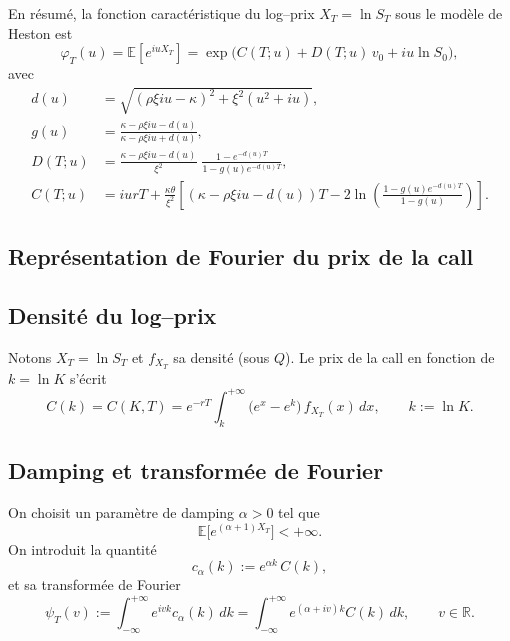 \documentclass[11pt,a4paper]{article}
\newcommand{\1}{\mathbf{1}}
\begin{document}
En r\'esum\'e, la fonction caract\'eristique du log--prix $X_T=\ln S_T$ sous
le mod\`ele de Heston est
\begin{equation}
\boxed{
\varphi_T(u)
= \mathbb{E}\!\left[ e^{i u X_T} \right]
= \exp\!\Big(
C(T;u) + D(T;u)\,v_0 + i u \ln S_0
\Big),
}
\end{equation}
avec
\begin{align}
d(u) &= \sqrt{(\rho\xi i u - \kappa)^2 + \xi^2(u^2+i u)},\\[3pt]
g(u) &= \frac{\kappa - \rho\xi i u - d(u)}{\kappa - \rho\xi i u + d(u)},\\[3pt]
D(T;u) &= \frac{\kappa - \rho\xi i u - d(u)}{\xi^2}\;
         \frac{1 - e^{-d(u)T}}{1 - g(u)e^{-d(u)T}},\\[3pt]
C(T;u) &= i u r T
+ \frac{\kappa\theta}{\xi^2}
  \left[
     \left(\kappa - \rho\xi i u - d(u)\right)T
     - 2\ln\!\left(\frac{1 - g(u)e^{-d(u)T}}{1 - g(u)}\right)
  \right].
\end{align}

\subsection{Repr\'esentation de Fourier du prix de la call}

\subsection{Densit\'e du log--prix}

Notons $X_T=\ln S_T$ et $f_{X_T}$ sa densit\'e (sous $Q$). Le prix de la call
en fonction de $k=\ln K$ s'\'ecrit
\begin{equation}
C(k) = C(K,T) = e^{-rT}\int_k^{+\infty}\big(e^x-e^k\big)\,f_{X_T}(x)\,dx,
\qquad k:=\ln K.
\end{equation}

\subsection{Damping et transform\'ee de Fourier}

On choisit un param\`etre de damping $\alpha>0$ tel que
\begin{equation}
\mathbb{E}\big[e^{(\alpha+1)X_T}\big] < +\infty.
\end{equation}
On introduit la quantit\'e
\begin{equation}
c_\alpha(k) := e^{\alpha k}\,C(k),
\end{equation}
et sa transform\'ee de Fourier
\begin{equation}
\psi_T(v) := \int_{-\infty}^{+\infty} e^{ivk} c_\alpha(k)\,dk
           = \int_{-\infty}^{+\infty} e^{(\alpha+iv)k} C(k)\,dk,
           \qquad v\in\mathbb{R}.
\end{equation}
\end{document}
